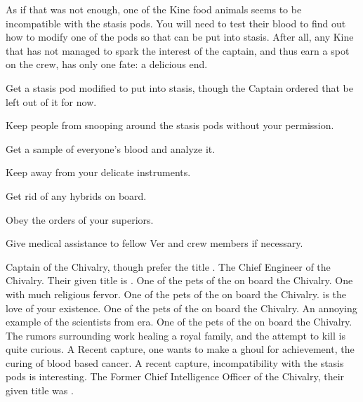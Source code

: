 \documentclass[char]{guildcamp4}
\begin{document}
As if that was not enough, one of the Kine food animals seems to be incompatible with the stasis pods. You will need to test their blood to find out how to modify one of the pods so that \cPlead{\they} can be put into stasis. After all, any Kine that has not managed to spark the interest of the captain, and thus earn a spot on the crew, has only one fate: a delicious end. 

\begin{itemz}[Goals]
	\item Get a stasis pod modified to put \cPlead{} into stasis, though the Captain ordered that \cPlead{} be left out of it for now.
	\item Keep people from snooping around the stasis pods without your permission.
	\item Get a sample of everyone's blood and analyze it.
	\item Keep \cJames{} away from your delicate instruments.
	\item Get rid of any hybrids on board.
	\item Obey the orders of your superiors.
	\item Give medical assistance to fellow Ver and crew members if necessary.
\end{itemz}

\begin{contacts}
	\contact{\cVone{}} Captain of the Chivalry, though \cVone{\they} prefer the title \cVone{\Duke}.
	\contact{\cVtwo{}} The Chief Engineer of the Chivalry. Their given title is \cVtwo{\Marq}.
	\contact{\cJoan{}} One of the pets of the \cVone{\Duke} on board the Chivalry. One with much religious fervor. 
	\contact{\cJulie{}} One of the pets of the \cVone{\Duke} on board the Chivalry. \cJulie{\they} is the love of your existence.
	\contact{\cJames{}} One of the pets of the \cVone{\Duke} on board the Chivalry. An annoying example of the scientists from \cJames{\their} era.
	\contact{\cRasputin{}} One of the pets of the \cVone{\Duke} on board the Chivalry. The rumors surrounding \cRasputin{\their} work healing a royal family, and the attempt to kill \cRasputin{\them} is quite curious.
	\contact{\cSpite{}} A Recent capture, one \cVone{} wants to make a ghoul for \cSpite{\their} achievement, the curing of blood based cancer.
	\contact{\cPlead{}} A recent capture, \cPlead{\their} incompatibility with the stasis pods is interesting.
	\contact{\cIntel{}} The Former Chief Intelligence Officer of the Chivalry, their given title was \cIntel{\Count}.
\end{contacts}
\end{document}
